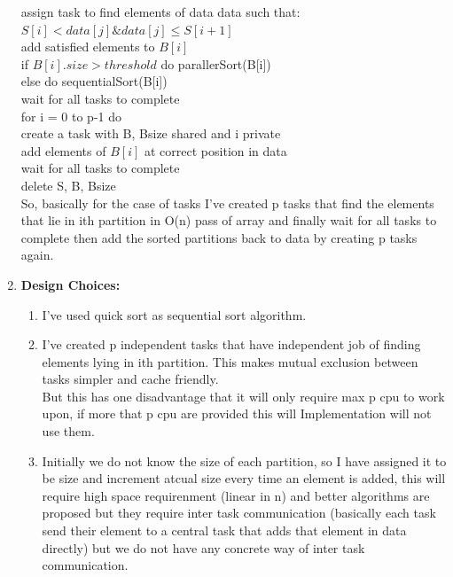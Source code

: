 \documentclass{article}
\begin{document}
\begin{enumerate}
\hspace*{1.5cm}assign task to find elements of data data such that:\\
\hspace*{2cm}$S[i] < data[j] \& data[j] \leq S[i+1]$\\
\hspace*{1.5cm}add satisfied elements to $B[i]$\\
\hspace*{1.5cm}if $B[i].size > threshold$ do parallerSort(B[i])\\
\hspace*{1.5cm}else do sequentialSort(B[i])\\
\hspace*{1cm}wait for all tasks to complete\\
\hspace*{1cm}for i = 0 to p-1 do\\
\hspace*{1.5cm}create a task with B, Bsize shared and i private\\
\hspace*{1.5cm}add elements of $B[i]$ at correct position in data\\
\hspace*{1cm}wait for all tasks to complete\\
\hspace*{1cm}delete S, B, Bsize\\

So, basically for the case of tasks I've created p tasks that find the elements that lie in ith 
partition in O(n) pass of array and finally wait for all tasks to complete then add the sorted partitions
back to data by creating p tasks again. 

\item \textbf{Design Choices: }

\begin{enumerate}
    \item I've used quick sort as sequential sort algorithm.
    \item I've created p independent tasks that have independent job of finding elements lying in ith partition.
        This makes mutual exclusion between tasks simpler and cache friendly.\\
        But this has one disadvantage that it will only require max p cpu to work upon, if more that p cpu are provided 
        this will Implementation will not use them.
    \item Initially we do not know the size of each partition, so I have assigned it to be size and increment atcual size every time an 
    element is added, this will require high space requirenment (linear in n) and better algorithms are proposed but they require inter task
    communication (basically each task send their element to a central task that adds that element in data directly) but we do not have any concrete way
    of inter task communication.

\end{enumerate}

\end{enumerate}
\end{document}
